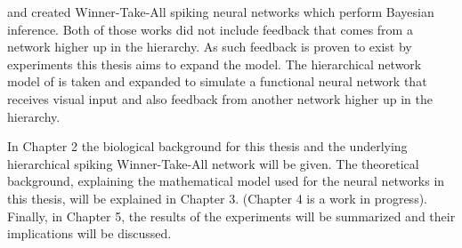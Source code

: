 \citet{nessler} and \citet{nesslerClone} created Winner-Take-All spiking neural networks which perform Bayesian inference. Both of those works did not include feedback that comes from a network higher up in the hierarchy. As such feedback is proven to exist by experiments this thesis aims to expand the model. The hierarchical network model of \citet{nessler} is taken and expanded to simulate a functional neural network that receives visual input and also feedback from another network higher up in the hierarchy.

In Chapter 2 the biological background for this thesis and the underlying hierarchical spiking Winner-Take-All network will be given. The theoretical background, explaining the mathematical model used for the neural networks in this thesis, will be explained in Chapter 3. (Chapter 4 is a work in progress). Finally, in Chapter 5, the results of the experiments will be summarized and their implications will be discussed.